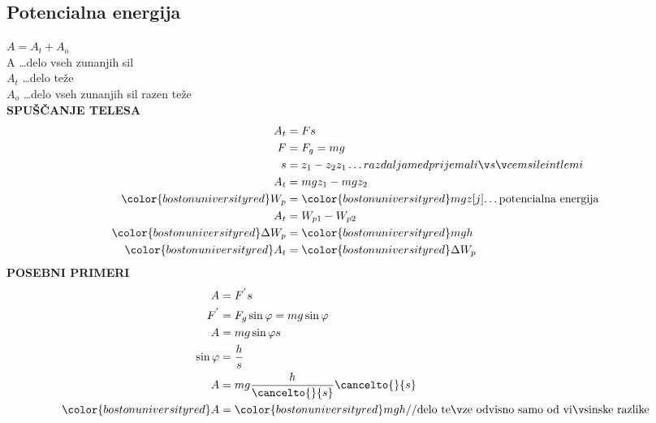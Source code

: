 {\color{indiagreen}\subsection{Potencialna energija}}
$A = A_t + A_o$\\
A \dots delo vseh zunanjih sil\\
$A_t$ \dots delo teže\\
$A_o$ \dots delo vseh zunanjih sil razen teže\\
\textbf{SPUŠČANJE TELESA}
\begin{align*}
	A_t &= Fs\\
	F &= F_g = mg\\
	s &= z_1 - z_2 \text{$z_1 \dots razdalja med prijemališčem sile in tlemi$}\\
	A_t &= mgz_1 - mgz_2\\
	{\color{bostonuniversityred}W_p} &= {\color{bostonuniversityred}mgz[j]} \text{\dots potencialna energija}\\
	A_t &= W_{p1} - W_{p2}\\
	{\color{bostonuniversityred}\Delta W_p} &= {\color{bostonuniversityred}mgh}\\
	{\color{bostonuniversityred}A_t} &= {\color{bostonuniversityred}\Delta W_p}\\
\end{align*}
\textbf{POSEBNI PRIMERI}
\begin{align*}
	A &= F^{'}s\\
	F^{'} &= F_g \sin\varphi = mg\sin\varphi\\
	A &= mg\sin\varphi s\\
	\sin\varphi &= \frac{h}{s}\\
	A &= mg\frac{h}{\cancelto{}{s}} \cancelto{}{s}\\
	{\color{bostonuniversityred}A} &= {\color{bostonuniversityred}mgh} \text{//delo teže odvisno samo od višinske razlike}\\
\end{align*}
